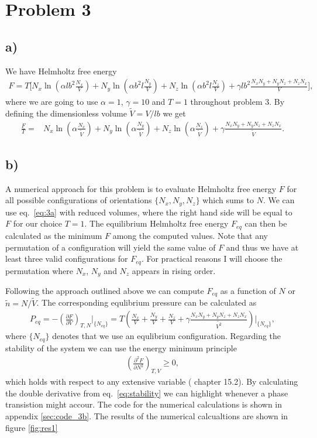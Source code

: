 \documentclass[reprint, amsmath, amssymb, aps, onecolumn]{revtex4-2}
\newcommand{\dd}[3]{\left(\frac{\partial #1}{\partial #2}\right)_{#3}}
\begin{document}
\section*{Problem 3}
\subsection*{a)}
\noindent We have Helmholtz free energy
\begin{align*}
  F = T\Big[ N_{x} \ln \left(\alpha l b^{2} \frac{N_{x}}{V}\right)+N_{y} \ln \left(\alpha b^{2} l \frac{N_{y}}{V}\right) + N_{z} \ln \left(\alpha b^{2} l \frac{N_{z}}{V}\right)+\gamma l b^{2} \frac{N_{x} N_{y}+N_{y} N_{z}+N_{z} N_{x}}{V}\Big],
\end{align*}
where we are going to use $\alpha = 1$, $\gamma = 10$ and $T = 1$ throughout problem 3. By defining the dimensionless volume $\tilde{V} = V/lb$ we get
\begin{align}
  \frac{F}{T} = &N_x \ln{\left(\alpha \frac{N_x}{\tilde{V}}\right)} + N_y \ln{\left(\alpha \frac{N_y}{\tilde{V}}\right)} + N_z \ln{\left(\alpha \frac{N_z}{\tilde{V}}\right)} + \gamma \frac{N_xN_y + N_yN_z + N_zN_x}{\tilde{V}}. \label{eq:3a}
\end{align}
%
%
\subsection*{b)}
\noindent A numerical approach for this problem is to evaluate Helmholtz free energy $F$ for all possible configurations of orientations $\{N_x, N_y, N_z\}$ which sums to $N$. We can use eq.~\eqref{eq:3a} with reduced volumes, where the right hand side will be equal to $F$ for our choice $T = 1$. The equilibrium Helmholtz free energy $F_{eq}$ can then be calculated as the minimum $F$ among the computed values. Note that any permutation of a configuration will yield the same value of $F$ and thus we have at least three valid configurations for $F_{eq}$. For practical reasons I will choose the permutation where $N_x$, $N_y$ and $N_z$ appears in rising order. \par
Following the approach outlined above we can compute $F_{eq}$ as a function of $N$ or $\tilde{n} = N/\tilde{V}$. The corresponding equlibrium pressure can be calculated as
\begin{align*}
  P_{eq} = -\dd{F}{V}{T,N} \Big|_{\{N_{eq}\}} = T\left(\frac{N_x}{V} + \frac{N_y}{V} + \frac{N_z}{V} + \gamma \frac{N_xN_y + N_yN_z + N_zN_x}{\tilde{V^2}}\right)\Big|_{\{N_{eq}\}},
\end{align*}
where $\{N_{eq}\}$ denotes that we use an equlibrium configuration. Regarding the stability of the system we can use the energy minimum principle
\begin{align}
  \left(\frac{\partial^2 F}{\partial N^2}\right)_{T,V} \ge 0, \label{eq:stability}
\end{align}
which holds with respect to any extensive variable \cite{Svendsen}( chapter 15.2). By calculating the double derivative from eq.~\eqref{eq:stability} we can highlight whenever a phase transistion might accour. The code for the numerical calculations is shown in appendix \ref{sec:code_3b}. The results of the numerical calcualtions are shown in figure \ref{fig:res1}
\end{document}
